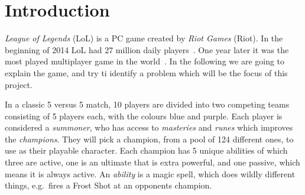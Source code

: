 \section{Introduction}\label{sec:intro}



\emph{League of Legends} (LoL) is a PC game created by \emph{Riot Games} (Riot). In the beginning of 2014 LoL had 27 million daily players~\cite{LoL27mill}. One year later it was the most played multiplayer game in the world~\cite{LoLmostplayed}. 
In the following we are going to explain the game, and try ti identify a problem which will be the focus of this project. 

In a classic 5 versus 5 match, 10 players are divided into two competing teams consisting of 5 players each, with the colours blue and purple. Each player is considered a \emph{summoner}, who has access to \emph{masteries} and \emph{runes} which improves the \emph{champions}. They will pick a champion, from a pool of 124 different ones, to use as their playable character. Each champion has 5 unique abilities of which three are active, one is an ultimate that is extra powerful, and one passive, which means it is always active. An \emph{ability} is a magic spell, which does wildly different things, e.g.\ fires a Frost Shot at an opponents champion. 

